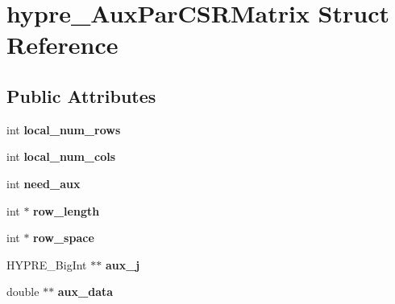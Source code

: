 \hypertarget{structhypre__AuxParCSRMatrix}{}\section{hypre\+\_\+\+Aux\+Par\+C\+S\+R\+Matrix Struct Reference}
\label{structhypre__AuxParCSRMatrix}
\subsection*{Public Attributes}
\begin{DoxyCompactItemize}
\item 
\hypertarget{structhypre__AuxParCSRMatrix_ae6129f05e6f91bea242e3aa739028c87}{}int {\bfseries local\+\_\+num\+\_\+rows}\label{structhypre__AuxParCSRMatrix_ae6129f05e6f91bea242e3aa739028c87}

\item 
\hypertarget{structhypre__AuxParCSRMatrix_a9c74835c311eb941c0e167c1af0b7b89}{}int {\bfseries local\+\_\+num\+\_\+cols}\label{structhypre__AuxParCSRMatrix_a9c74835c311eb941c0e167c1af0b7b89}

\item 
\hypertarget{structhypre__AuxParCSRMatrix_a3f10be53f8e39667c5bbae2678544951}{}int {\bfseries need\+\_\+aux}\label{structhypre__AuxParCSRMatrix_a3f10be53f8e39667c5bbae2678544951}

\item 
\hypertarget{structhypre__AuxParCSRMatrix_a3d3d13bce662da007ad5f953f44076f9}{}int $\ast$ {\bfseries row\+\_\+length}\label{structhypre__AuxParCSRMatrix_a3d3d13bce662da007ad5f953f44076f9}

\item 
\hypertarget{structhypre__AuxParCSRMatrix_afa4cdac6f61c33760dd85be1fb1b3c3b}{}int $\ast$ {\bfseries row\+\_\+space}\label{structhypre__AuxParCSRMatrix_afa4cdac6f61c33760dd85be1fb1b3c3b}

\item 
\hypertarget{structhypre__AuxParCSRMatrix_abaa2a20a0a4f5924991e9ecd80d9b530}{}H\+Y\+P\+R\+E\+\_\+\+Big\+Int $\ast$$\ast$ {\bfseries aux\+\_\+j}\label{structhypre__AuxParCSRMatrix_abaa2a20a0a4f5924991e9ecd80d9b530}

\item 
\hypertarget{structhypre__AuxParCSRMatrix_a896fc21fefc50a36ecbf44658b6ecdf9}{}double $\ast$$\ast$ {\bfseries aux\+\_\+data}\label{structhypre__AuxParCSRMatrix_a896fc21fefc50a36ecbf44658b6ecdf9}


\end{DoxyCompactItemize}
